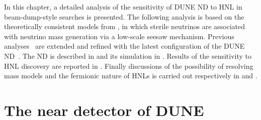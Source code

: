 In this chapter, a detailed analysis of the sensitivity of DUNE ND to HNL in beam-dump-style searches is presented.
The following analysis is based on the theoretically consistent models from , %
in which sterile neutrinos are associated with neutrino mass generation via a low-scale seesaw mechanism.
Previous analyses~\cite{Krasnov:2019kdc, Adams:2013qkq} are extended and refined
with the latest configuration of the DUNE ND~\cite{Abi:2020wmh}.
The ND is described in  and its simulation in .
Results of the sensitivity to HNL discovery are reported in .
Finally discussions of the possibility of resolving mass models and the fermionic nature of HNLs is %
carried out respectively in  and .


\section{The near detector of DUNE}
\label{sec:dunend}


